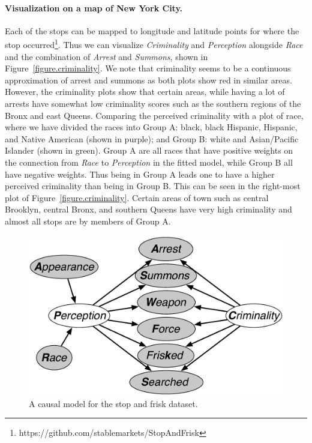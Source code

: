 \paragraph{Visualization on a map of New York City.}
Each of the stops can be mapped to longitude and latitude points for where the stop occurred\footnote{https://github.com/stablemarkets/StopAndFrisk}. Thus we can visualize \emph{Criminality} and \emph{Perception} alongside \emph{Race} and the combination of \emph{Arrest} and \emph{Summons}, shown in Figure~\ref{figure.criminality}. We note that criminality seems to be a continuous approximation of arrest and summons as both plots show red in similar areas. However, the criminality plots show that certain areas, while having a lot of arrests have somewhat low criminality scores such as the southern regions of the Bronx and east Queens. Comparing the perceived criminality with a plot of race, where we have divided the races into Group A: black, black Hispanic, Hispanic, and Native American (shown in purple); and Group B: white and Asian/Pacific Islander (shown in green). Group A are all races that have positive weights on the connection from \emph{Race} to \emph{Perception} in the fitted model, while Group B all have negative weights. Thus being in Group A leads one to have a higher perceived criminality than being in Group B. This can be seen in the right-most plot of Figure~\ref{figure.criminality}. Certain areas of town such as central Brooklyn, central Bronx, and southern Queens have very high criminality and almost all stops are by members of Group A.

\begin{figure}[th]
\begin{center}
\vspace{-1ex}
\centerline{\includegraphics[width=\columnwidth]{stop_and_frisk_model3.pdf}}
\vspace{-2ex}
\caption{A causal model for the stop and frisk dataset.\label{figure.stop_and_frisk}\vspace{-4ex}}
\vspace{-2ex}
\end{center}
\end{figure}



